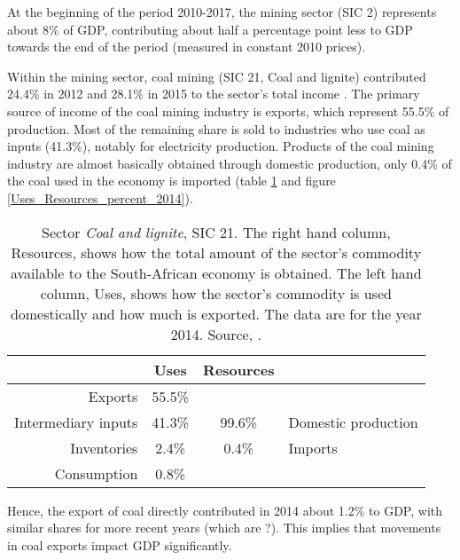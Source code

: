 \documentclass[12pt,english]{article}
\begin{document}
At the beginning of the period 2010-2017, the mining sector (SIC 2) represents about 8\% of GDP, contributing about half a percentage point less to GDP towards the end of the period \citep{P0441StatSA2018Q2} (measured in constant 2010 prices). 

Within the mining sector, coal mining (SIC 21, Coal and lignite) contributed 24.4\% in 2012 and 28.1\% in 2015 to the sector's total income \citep{mining2015}. The primary source of income of the coal mining industry is exports, which represent 55.5\% of production. Most of the remaining share is sold to industries who use coal as inputs (41.3\%), notably for electricity production. Products of the coal mining industry are almost basically obtained through domestic production, only 0.4\% of the coal used in the economy is imported (table \ref{Mining2104_UR} and figure \ref{Uses_Resources_percent_2014}).

\begin{table}[!h]
	\centering
	\begin{tabular}{rc|cl}
		\hline
		& Uses & Resources  \\ 
		\hline
		Exports & 55.5\% & &\\ 
		Intermediary inputs &  41.3\%  & 99.6\% &  Domestic production\\ 
		Inventories &  2.4\% & 0.4\% & Imports    \\ 
		Consumption & 0.8\% &  &\\ 
		\hline
	\end{tabular}
	\caption{\label{Mining2104_UR}Sector \emph{Coal and lignite}, SIC 21. The right hand column, Resources, shows how the total amount of the sector's commodity available to the South-African economy is obtained. The left hand column, Uses, shows how the sector's commodity is used domestically and how much is exported. The data are for the year 2014. Source, \cite{IOT2014}.}
\end{table} 

Hence, the export of coal directly contributed in 2014 about 1.2\% to GDP, with similar shares for more recent years (which are ?). This implies that movements in coal exports impact GDP significantly. 
\end{document}
